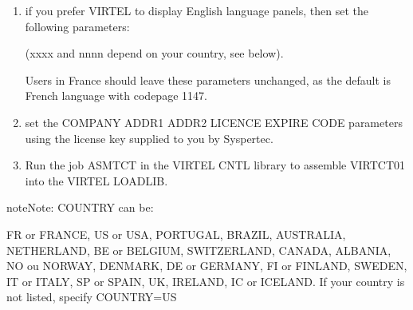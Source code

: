 \documentclass[letterpaper,10pt,english]{sphinxmanual}
\begin{document}
\begin{enumerate}
\begin{enumerate}
\item {} 
\sphinxAtStartPar
if you prefer VIRTEL to display English language panels, then set
the following parameters:

\begin{sphinxVerbatim}[commandchars=\\\{\}]
                                               
                                           
                                        
\end{sphinxVerbatim}

\sphinxAtStartPar
(xxxx and nnnn depend on your country, see below).

\sphinxAtStartPar
Users in France should leave these parameters unchanged, as the
default is French language with codepage 1147.

\item {} 
\sphinxAtStartPar
set the COMPANY ADDR1 ADDR2 LICENCE EXPIRE CODE parameters using
the license key supplied to you by Syspertec.

\item {} 
\sphinxAtStartPar
Run the job ASMTCT in the VIRTEL CNTL library to assemble VIRTCT01
into the VIRTEL LOADLIB.

\end{enumerate}

\end{enumerate}

\begin{sphinxadmonition}{note}{Note:}
\sphinxAtStartPar
COUNTRY can be:

\sphinxAtStartPar
FR or FRANCE, US or USA, PORTUGAL, BRAZIL, AUSTRALIA,
NETHERLAND, BE or BELGIUM, SWITZERLAND, CANADA, ALBANIA,
NO ou NORWAY, DENMARK, DE or GERMANY, FI or FINLAND,
SWEDEN, IT or ITALY, SP or SPAIN, UK, IRELAND, IC or ICELAND.
If your country is not listed, specify COUNTRY=US
\end{sphinxadmonition}
\end{document}
